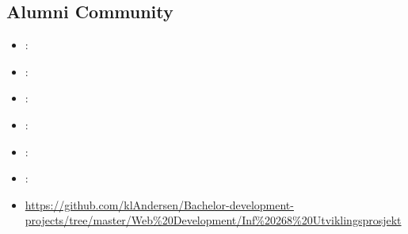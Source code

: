 \label{sec:section8}

\subsection{Alumni Community}
\label{sec:alumni}
\begin{itemize} 
	\item {}: 
	\item {}: 
	\item {}: 
	\item {}: 
	\item {}: 
	\item {}: 
	\item {} \url{https://github.com/klAndersen/Bachelor-development-projects/tree/master/Web%20Development/Inf%20268%20Utviklingsprosjekt}
\end{itemize} 

